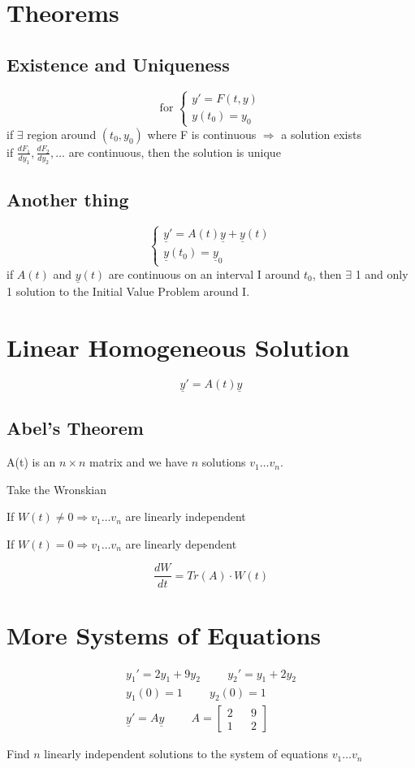 \documentclass[fleqn]{report}
\newcommand{\hp}{\hspace{1cm}}
\newcommand{\equations} [1] {
\begin{gather*}
#1
\end{gather*}
}
\begin{document}
\newpage
\section{Theorems}


\subsection{Existence and Uniqueness}
\[
\textrm{for } 
\begin{cases}
y' = F(t, y)
\\
y(t_{0}) = y_{0}
\end{cases}
\]
if $\exists$ region around $(t_{0}, y_{0})$ where F is continuous $\Rightarrow$ a solution exists
\\
if $\frac{dF_{1}}{dy_{1}}, \frac{dF_{2}}{dy_{2}}, \ldots$ are continuous, then the solution is unique

\subsection{Another thing}
\[
\begin{cases}
\underline{y}' = A(t) \underline{y} +  \underline{y} (t)
\\
 \underline y (t_0) = \underline y_0
\end{cases}
\]
if $A(t)$ and $\underline y (t)$ are continuous on an interval I around $t_0$, then $\exists$ 1 and only 1 solution to the Initial Value Problem around I.

\section{Linear Homogeneous Solution}
\[
\underline y' = A(t) \underline y
\]

\subsection{Abel's Theorem}

A(t) is an $n \times n$ matrix and we have $n$ solutions $v_1 \ldots v_n$.

Take the Wronskian

If $W(t) \neq 0 \Rightarrow v_1 \ldots v_n$ are linearly independent

If $W(t) = 0 \Rightarrow v_1 \ldots v_n$ are linearly dependent

\[
\frac{dW}{dt} = Tr (A) \cdot W(t)
\]


\section{More Systems of Equations}
\equations{
y_1 ' = 2y_1 + 9y_2
\hp
y_2 ' = y_1 + 2y_2
\\
y_1(0) = 1 \hp y_2 (0) = 1
\\
\underline y' = A \underline y \hp 
A =
\begin{bmatrix}
2 && 9 \\
1 && 2
\end{bmatrix}
}
Find $n$ linearly independent solutions to the system of equations $v_1 \ldots v_n$
\end{document}
